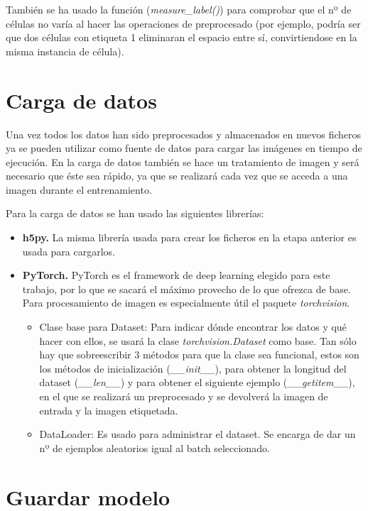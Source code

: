 También se ha usado la función (\textit{measure\_label()}) para comprobar que el nº de células no varía al hacer las operaciones de preprocesado (por ejemplo, podría ser que dos células con etiqueta 1 eliminaran el espacio entre sí, convirtiendose en la misma instancia de célula).

\section{Carga de datos}\label{sec:carga_datos}

Una vez todos los datos han sido preprocesados y almacenados en nuevos ficheros ya se pueden utilizar como fuente de datos para cargar las imágenes en tiempo de ejecución. En la carga de datos también se hace un tratamiento de imagen y será necesario que éste sea rápido, ya que se realizará cada vez que se acceda a una imagen durante el entrenamiento.

Para la carga de datos se han usado las siguientes librerías:
\begin{itemize}
\item \textbf{h5py.} La misma librería usada para crear los ficheros en la etapa anterior es usada para cargarlos.
\item \textbf{PyTorch.} PyTorch es el framework de deep learning elegido para este trabajo, por lo que se sacará el máximo provecho de lo que ofrezca de base. Para procesamiento de imagen es especialmente útil el paquete \textit{torchvision}.
\begin{itemize}
\item Clase base para Dataset: Para indicar dónde encontrar los datos y qué hacer con ellos, se usará la clase \textit{torchvision.Dataset} como base. Tan sólo hay que sobreescribir 3 métodos para que la clase sea funcional, estos son los métodos de inicialización (\textit{\_\_init\_\_}), para obtener la longitud del dataset (\textit{\_\_len\_\_}) y para obtener el siguiente ejemplo (\textit{\_\_getitem\_\_}), en el que se realizará un preprocesado y se devolverá la imagen de entrada y la imagen etiquetada.
\item DataLoader: Es usado para administrar el dataset. Se encarga de dar un nº de ejemplos aleatorios igual al batch seleccionado.
\end{itemize}
\end{itemize}

\section{Guardar modelo}\label{sec:store_model}

